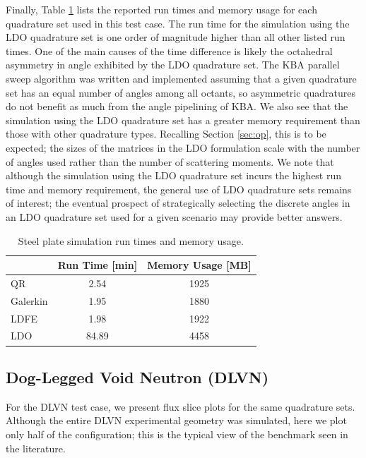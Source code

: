 \documentclass{article} %
\begin{document}
Finally, Table \ref{steel-stats} lists the reported run times and memory usage
for each quadrature set used in this test case. The run time for the
simulation using the LDO quadrature set is one order of magnitude higher than
all other listed run times. One of the main causes of the time difference is
likely the octahedral asymmetry in angle exhibited by the LDO quadrature set.
The KBA parallel sweep algorithm was written and implemented assuming that a
given quadrature set has an equal number of angles among all octants, so
asymmetric quadratures do not benefit as much from the angle pipelining of
KBA. We also see that the simulation using the LDO quadrature set has a
greater memory requirement than those with other quadrature types. Recalling
Section \ref{sec:op}, this is to be expected; the sizes of the matrices in
the LDO formulation scale with the number of angles used rather than the
number of scattering moments. We note that although the simulation using the
LDO quadrature set incurs the highest run time and memory requirement, the
general use of LDO quadrature sets remains of interest; the eventual prospect
of strategically selecting the discrete angles in an LDO quadrature set used
for a given scenario may provide better answers.

\begin{table}[!htb]
\centering
\caption{Steel plate simulation run times and memory usage.}
\label{steel-stats}
\begin{tabular}{l|cc}
              & Run Time [min]       & Memory Usage [MB]      \\ \hline
QR            & 2.54 & 1925         \\
Galerkin      & 1.95 & 1880         \\
LDFE          & 1.98 & 1922         \\
LDO           & 84.89 & 4458
\end{tabular}
\end{table}

\FloatBarrier
\subsection{Dog-Legged Void Neutron (DLVN)}

For the DLVN test case, we present flux slice plots for the same 
quadrature sets. Although the entire DLVN
experimental geometry was simulated, here we plot only half of the
configuration; this is the typical view of the benchmark seen in the
literature.
\end{document}
